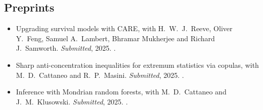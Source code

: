 \documentclass{wgu-cv}
\begin{document}
\subsection{Preprints}{}
\begin{itemize}

  \item Upgrading survival models with CARE,
    with H.\ W.\ J.\ Reeve, Oliver Y.\ Feng,
    Samuel A.\ Lambert, Bhramar Mukherjee and Richard J.\ Samworth.
    \emph{Submitted}, 2025.
    .

  \item Sharp anti-concentration inequalities
    for extremum statistics via copulas,
    with M.\ D.\ Cattaneo and R.\ P.\ Masini.
    \emph{Submitted}, 2025.
    .

  \item Inference with Mondrian random forests,
    with M.\ D.\ Cattaneo and J.\ M.\ Klusowski.
    \emph{Submitted}, 2025.
    .

\end{itemize}



\end{document}
